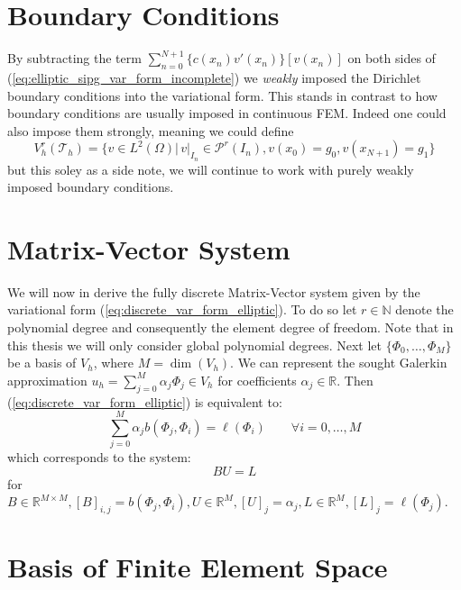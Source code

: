 \section{Boundary Conditions}
By subtracting the term $\sum_{n=0}^{N+1} \{c(x_n)v'(x_n)\}[v(x_n)]$ on both sides
of (\ref{eq:elliptic_sipg_var_form_incomplete}) we \textit{weakly} imposed the Dirichlet
boundary conditions into the variational form. This stands in contrast to how boundary 
conditions are usually imposed in continuous FEM. Indeed one could also impose them strongly,
meaning we could define 
\begin{equation*}
    V_h^r(\mathcal{T}_h) = \{v \in L^2(\Omega) |\, v|_{I_n} \in \mathcal{P}^r(I_n), v(x_0)=g_0, v(x_{N+1})=g_1 \}
\end{equation*}
but this soley as a side note, we will continue to work with purely weakly imposed 
boundary conditions.  

\section{Matrix-Vector System}
We will now in derive the fully discrete Matrix-Vector system given by
the variational form (\ref{eq:discrete_var_form_elliptic}). To do so let
$r \in \mathbb{N}$ denote the polynomial degree and consequently the element degree of freedom. Note that in this thesis we will only consider global polynomial degrees.
Next let $\{\Phi_0,\ldots,\Phi_M\}$ be a basis of $V_h$, where $M = \dim(V_h)$.
We can represent the sought Galerkin approximation $u_h = \sum_{j=0}^{M} \alpha_j \Phi_j\in V_h$ for coefficients 
$\alpha_j \in \mathbb{R}$. Then (\ref{eq:discrete_var_form_elliptic}) is equivalent to:
\begin{equation*}
    \sum_{j=0}^{M} \alpha_j b(\Phi_j, \Phi_i) = \ell(\Phi_i) \qquad \forall i=0,\ldots,M
\end{equation*}
which corresponds to the system:
\begin{equation}
    \label{eq:fully_discrete_dg_system_elliptic}
    BU = L
\end{equation}
for $B \in \mathbb{R}^{M\times M}, [B]_{i,j} = b(\Phi_j, \Phi_i), 
U \in \mathbb{R}^M, [U]_j = \alpha_j, 
L\in\mathbb{R}^M, [L]_j = \ell(\Phi_j)$.

\section{Basis of Finite Element Space}

